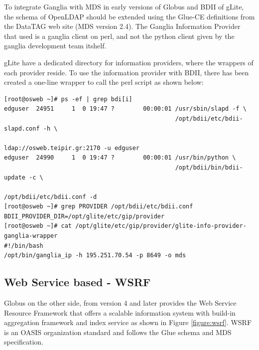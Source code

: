 To integrate Ganglia with MDS in early versions of Globus and BDII of gLite, the schema of OpenLDAP should be extended using the Glue-CE definitions from the DataTAG web site (MDS version 2.4). The Ganglia Information Provider that used is a ganglia client on perl, and not the python client given by the ganglia development team itshelf.

gLite have a dedicated directory for information providers, where the wrappers of each provider reside. To use the information provider with BDII, there has been created a one-line wrapper to call the perl script as shown below:

\begin{verbatim}
[root@osweb ~]# ps -ef | grep bdi[i]
edguser  24951     1  0 19:47 ?        00:00:01 /usr/sbin/slapd -f \
                                                /opt/bdii/etc/bdii-slapd.conf -h \
                                                ldap://osweb.teipir.gr:2170 -u edguser
edguser  24990     1  0 19:47 ?        00:00:01 /usr/bin/python \
                                                /opt/bdii/bin/bdii-update -c \
                                                /opt/bdii/etc/bdii.conf -d
[root@osweb ~]# grep PROVIDER /opt/bdii/etc/bdii.conf
BDII_PROVIDER_DIR=/opt/glite/etc/gip/provider
[root@osweb ~]# cat /opt/glite/etc/gip/provider/glite-info-provider-ganglia-wrapper
#!/bin/bash
/opt/bin/ganglia_ip -h 195.251.70.54 -p 8649 -o mds
\end{verbatim}

\subsection{Web Service based - WSRF}

Globus on the other side, from version 4 and later provides the Web Service Resource Framework that offers a scalable information system with build-in aggregation framework and index service as shown in Figure \ref{figure:wsrf}. WSRF is an OASIS organization standard and follows the Glue schema and MDS specification.

